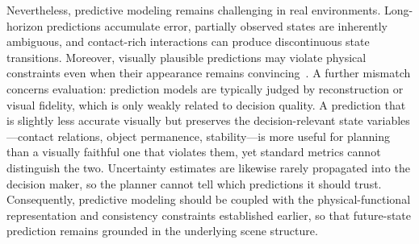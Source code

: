 \documentclass{SCIS2026}
\begin{document}
Nevertheless, predictive modeling remains challenging in real environments. Long-horizon predictions accumulate error, partially observed states are inherently ambiguous, and contact-rich interactions can produce discontinuous state transitions. Moreover, visually plausible predictions may violate physical constraints even when their appearance remains convincing~\cite{kang2024far}. A further mismatch concerns evaluation: prediction models are typically judged by reconstruction or visual fidelity, which is only weakly related to decision quality. A prediction that is slightly less accurate visually but preserves the decision-relevant state variables---contact relations, object permanence, stability---is more useful for planning than a visually faithful one that violates them, yet standard metrics cannot distinguish the two. Uncertainty estimates are likewise rarely propagated into the decision maker, so the planner cannot tell which predictions it should trust. Consequently, predictive modeling should be coupled with the physical-functional representation and consistency constraints established earlier, so that future-state prediction remains grounded in the underlying scene structure.
\end{document}
